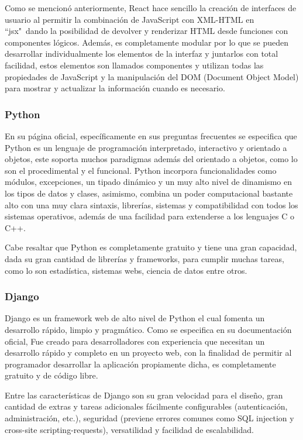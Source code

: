 Como se mencionó anteriormente, React hace sencillo la creación de interfaces
de usuario al permitir la combinación de JavaScript con XML-HTML en ``jsx"\  dando
la posibilidad de devolver y renderizar HTML desde funciones con componentes
lógicos. Además, es completamente modular por lo que se pueden desarrollar
individualmente los elementos de la interfaz y juntarlos con total facilidad,
estos elementos son llamados componentes y utilizan todas las propiedades de
JavaScript y la manipulación del DOM (Document Object Model) para mostrar
y actualizar la información cuando es necesario.


\subsubsection{Python}

En su página oficial, específicamente en sus preguntas frecuentes
\cite{pythonDocs} se especifica que Python es un lenguaje de programación
interpretado, interactivo y orientado a objetos, este soporta muchos paradigmas
además del orientado a objetos, como lo son el procedimental y el funcional.
Python incorpora funcionalidades como módulos, excepciones, un tipado dinámico
y un muy alto nivel de dinamismo en los tipos de datos y clases, asimismo,
combina un poder computacional bastante alto con una muy clara sintaxis,
librerías, sistemas y compatibilidad con todos los sistemas operativos, además
de una facilidad para extenderse a los lenguajes C o C++.

Cabe resaltar que Python es completamente gratuito y tiene una gran capacidad,
dada su gran cantidad de librerías y frameworks, para cumplir muchas tareas,
como lo son estadística, sistemas webs, ciencia de datos entre otros.

\subsubsection{Django}

Django es un framework web de alto nivel de Python el cual fomenta un
desarrollo rápido, limpio y pragmático. Como se especifica en su documentación
oficial,
\cite{DjangoDoc} Fue creado para desarrolladores con experiencia que necesitan
un desarrollo rápido y completo en un proyecto web, con la finalidad de
permitir al programador desarrollar la aplicación propiamente dicha, es
completamente gratuito y de código libre.

Entre las características de Django son su gran velocidad para el diseño, gran
cantidad de extras y tareas adicionales fácilmente configurables
(autenticación, administración, etc.), seguridad (previene errores comunes
como SQL injection y  cross-site scripting-requests), versatilidad y facilidad
de escalabilidad.

